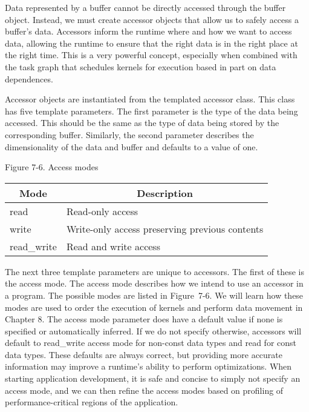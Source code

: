 Data represented by a buffer cannot be directly accessed through the buffer object. Instead, we must create accessor objects that allow us to safely access a buffer’s data. Accessors inform the runtime where and how we want to access data, allowing the runtime to ensure that the right data is in the right place at the right time. This is a very powerful concept, especially when combined with the task graph that schedules kernels for execution based in part on data dependences.\par

Accessor objects are instantiated from the templated accessor class. This class has five template parameters. The first parameter is the type of the data being accessed. This should be the same as the type of data being stored by the corresponding buffer. Similarly, the second parameter describes the dimensionality of the data and buffer and defaults to a value of one.\par

\hspace*{\fill} \par %
Figure 7-6. Access modes
\begin{table}[H]
	\begin{tabular}{|l|l|}
		\hline
		\multicolumn{1}{|c|}{Mode} & \multicolumn{1}{c|}{Description}               \\ \hline
		read                       & Read-only access                               \\ \hline
		write                      & Write-only access preserving previous contents \\ \hline
		read\_write                & Read and write access                          \\ \hline
	\end{tabular}
\end{table}

The next three template parameters are unique to accessors. The first of these is the access mode. The access mode describes how we intend to use an accessor in a program. The possible modes are listed in Figure 7-6. We will learn how these modes are used to order the execution of kernels and perform data movement in Chapter 8. The access mode parameter does have a default value if none is specified or automatically inferred. If we do not specify otherwise, accessors will default to read\_write access mode for non-const data types and read for const data types. These defaults are always correct, but providing more accurate information may improve a runtime’s ability to perform optimizations. When starting application development, it is safe and concise to simply not specify an access mode, and we can then refine the access modes based on profiling of performance-critical regions of the application.\par

